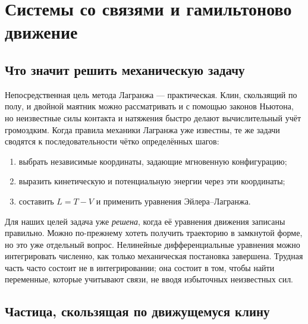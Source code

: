 \chapter{Системы со связями и гамильтоново движение}


\section{Что значит решить механическую задачу}

Непосредственная цель метода Лагранжа — практическая. Клин, скользящий по полу, и двойной маятник можно рассматривать и с помощью законов Ньютона, но неизвестные силы контакта и натяжения быстро делают вычислительный учёт громоздким. Когда правила механики Лагранжа уже известны, те же задачи сводятся к последовательности чётко определённых шагов:
\begin{enumerate}
  \item выбрать независимые координаты, задающие мгновенную конфигурацию;
  \item выразить кинетическую и потенциальную энергии через эти координаты;
  \item составить \(L=T-V\) и применить уравнения Эйлера--Лагранжа.
\end{enumerate}

Для наших целей задача уже \emph{решена}, когда её уравнения движения записаны правильно. Можно по-прежнему хотеть получить траекторию в замкнутой форме, но это уже отдельный вопрос. Нелинейные дифференциальные уравнения можно интегрировать численно, как только механическая постановка завершена. Трудная часть часто состоит не в интегрировании; она состоит в том, чтобы найти переменные, которые учитывают связи, не вводя избыточных неизвестных сил.

\section{Частица, скользящая по движущемуся клину}

